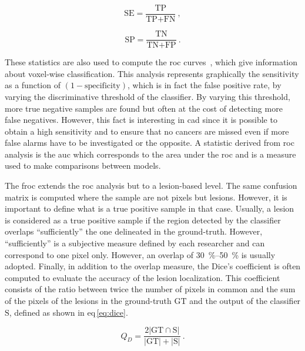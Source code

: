 \begin{equation}
  \text{SE} = \frac{\text{TP}}{\text{TP} + \text{FN}} \ ,
  \label{eq:sens}
\end{equation}

\begin{equation}
  \text{SP} = \frac{\text{TN}}{\text{TN} + \text{FP}} \ .
  \label{eq:spec}
\end{equation}

These statistics are also used to compute the \ac{roc} curves~\cite{Metz2006}, which give information about voxel-wise classification.
This analysis represents graphically the sensitivity as a function of $(1 - \text{specificity})$, which is in fact the false positive rate, by varying the discriminative threshold of the classifier.
By varying this threshold, more true negative samples are found but often at the cost of detecting more false negatives.
However, this fact is interesting in \ac{cad} since it is possible to obtain a high sensitivity and to ensure that no cancers are missed even if more false alarms have to be investigated or the opposite.
A statistic derived from \ac{roc} analysis is the \acf{auc} which corresponds to the area under the \ac{roc} and is a measure used to make comparisons between models.

The \acf{froc} extends the \ac{roc} analysis but to a lesion-based level.
The same confusion matrix is computed where the sample are not pixels but lesions.
However, it is important to define what is a true positive sample in that case.
Usually, a lesion is considered as a true positive sample if the region detected by the classifier overlaps ``sufficiently'' the one delineated in the ground-truth.
However, ``sufficiently'' is a subjective measure defined by each researcher and can correspond to one pixel only.
However, an overlap of \SIrange{30}{50}{\percent} is usually adopted.
Finally, in addition to the overlap measure, the Dice's coefficient is often computed to evaluate the accuracy of the lesion localization.
This coefficient consists of the ratio between twice the number of pixels in common and the sum of the pixels of the lesions in the ground-truth $\text{GT}$ and the output of the classifier $\text{S}$, defined as shown in \acs{eq}\,\eqref{eq:dice}.

\begin{equation}
  Q_D = \frac{2 | \text{GT} \cap \text{S} |}{| \text{GT} | + | \text{S} |} \ .
  \label{eq:dice}
\end{equation}
